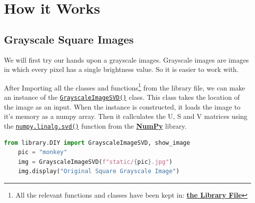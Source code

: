 \section{How it Works}

	\subsection{Grayscale Square Images}

		We will first try our hands upon a grayscale images. Grayscale images are images in which every pixel has a single brightness value. So it is easier to work with.
		
		After Importing all the classes and functions\footnote{All the relevant functions and classes have been kept in: \href{https://github.com/PeithonKing/comp_phys_P346/blob/main/library/DIY.py}{\textbf{the Library File}}} from the library file, we can make an instance of the \href{https://github.com/PeithonKing/comp_phys_P346/blob/main/library/DIY.py#L50-L72}{\texttt{GrayscaleImageSVD()}} class. This class takes the location of the image as an input. When the instance is constructed, it loads the image to it's memory as a numpy array. Then it callculates the U, S and V matrices using the \href{https://numpy.org/doc/stable/reference/generated/numpy.linalg.svd.html}{\texttt{numpy.linalg.svd()}} function from the \href{https://numpy.org/}{\textbf{NumPy}} library.
		\vspace{-2mm}

		\begin{center}
			\noindent{}
		\end{center}

		\begin{lstlisting}[language=Python, caption={Creating GrayscaleImageSVD class}]
	from library.DIY import GrayscaleImageSVD, show_image
	pic = "monkey"
	img = GrayscaleImageSVD(f"static/{pic}.jpg")
	img.display("Original Square Grayscale Image")\end{lstlisting}
		
